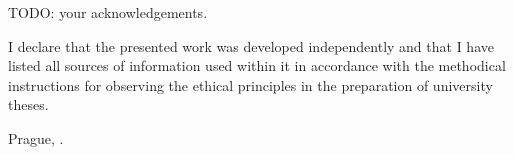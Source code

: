 \documentclass[twoside]{ctuthesis}
\begin{document}
\begin{abstract-english}

\end{abstract-english}

\begin{abstract-czech}

\end{abstract-czech}

\begin{thanks}
TODO: your acknowledgements.
\end{thanks}

\begin{declaration}
I declare that the presented work was developed independently and that I have listed all sources of information
used within it in accordance with the methodical instructions for observing the ethical principles in the
preparation of university theses.

Prague, .~~
\end{declaration}

\maketitle













\appendix

\end{document}
